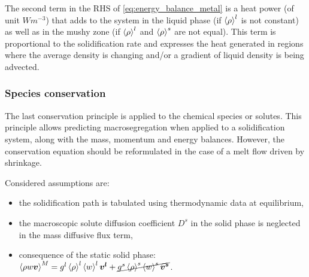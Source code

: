 %

The second term in the RHS of \cref{eq:energy_balance_metal} is a heat power (of unit $Wm^{-3}$) 
that adds to the system in the liquid phase (if $\left \langle \rho \right \rangle^l$ is not constant) as well as in the mushy zone (if $\left \langle \rho \right \rangle^l$ and $\left \langle \rho \right \rangle^s$ are not equal). 
This term is proportional to the solidification rate and expresses 
the heat generated in regions where the average density is changing and/or a gradient of liquid density is being advected.

\subsubsection{Species conservation}
The last conservation principle is applied to the chemical species or solutes. This principle allows predicting
macrosegregation when applied to a solidification system, along with the mass, momentum and energy balances.
However, the conservation equation should be reformulated in the case of a melt flow driven by shrinkage.

Considered assumptions are: 
\begin{itemize}
\itemsep0em
\item %
	  the solidification path is tabulated using thermodynamic data at equilibrium,
\item the macroscopic solute diffusion coefficient $D^s$ in the solid phase is neglected in the mass diffusive flux term,
\item consequence of the static solid phase: $\left \langle \rho w \boldsymbol{v} \right \rangle^M = {g^l} \left \langle \rho \right \rangle^l \left \langle w \right \rangle^l \boldsymbol{v^l} +  \cancel{{g^s} \left \langle \rho \right \rangle^s \left \langle w \right \rangle^s \boldsymbol{v^s}}$.
\end{itemize}

